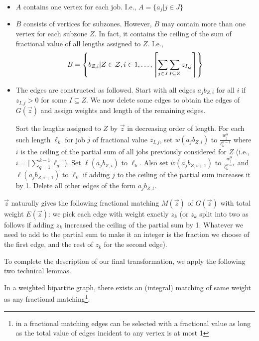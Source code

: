 \begin{itemize}
\item
  $A$ contains one vertex for each job. I.e., $A = \{a_j | j \in J\}$
\item
  $B$ consists of vertices for subzones. However, $B$ may contain more than one vertex for each subzone $Z$. In fact, it contains the ceiling of the sum of fractional value of all lengths assigned to $Z$. I.e.,
  \[
  B = \left\{b_{Z,i} | Z \in {\cal Z}, i \in 1,\ldots, \left\lceil \sum_{j \in J} \sum_{I \subseteq Z } z_{I,j} \right\rceil \right\}
  \]


\item
  The edges are constructed as followed. Start with all edges $a_jb_{Z,i}$ for all $i$ if $z_{I,j}>0$ for some $I \subseteq Z$. We now delete some edges to obtain the edges of $G(\vec{z})$ and assign weights and length of the remaining edges.

  Sort the lengths assigned to $Z$ by $\vec{z}$ in decreasing order of length. For each such length $\ell_k$ for job $j$ of fractional value $z_{I,j}$, set $w(a_jb_{Z,i})$ to $\frac{w_j^\alpha}{\ell_k^{\alpha-1}}$ where $i$ is the ceiling of the partial sum of all jobs previously considered for $Z$ (i.e., $i=\lceil \sum_{q=1}^{k-1} \ell_{q} \rceil$). Set $\ell(a_jb_{Z,i})$ to $\ell_k$. Also set $w(a_jb_{Z,i+1})$ to $\frac{w_j^\alpha}{\ell_k^{\alpha-1}}$ and $\ell(a_jb_{Z,i+1})$ to $\ell_k$ if adding $j$ to the ceiling of the partial sum increases it by 1. Delete all other edges of the form $a_jb_{Z,t}$.
\end{itemize}

$\vec{z}$ naturally gives the following fractional matching $M(\vec{z})$ of $G(\vec{z})$ with total weight $E(\vec{z})$: we pick each edge with weight exactly $z_k$ (or $z_k$ split into two as follows if adding $z_k$ increased the ceiling of the partial sum by 1. Whatever we need to add to the partial sum to make it an integer is the fraction we choose of the first edge, and the rest of $z_k$ for the second edge).

To complete the description of our final transformation, we apply the following two technical lemmas.


\begin{lem}\label{lemma:integer-matching}\cite{Lovasz_Plummer_matching,Shmoys_Tardos}
  In a weighted bipartite graph, there exists an (integral) matching of same weight as any fractional matching\footnote{in a fractional matching edges can be selected with a fractional value as long as the total value of edges incident to any vertex is at most 1}.
\end{lem}

